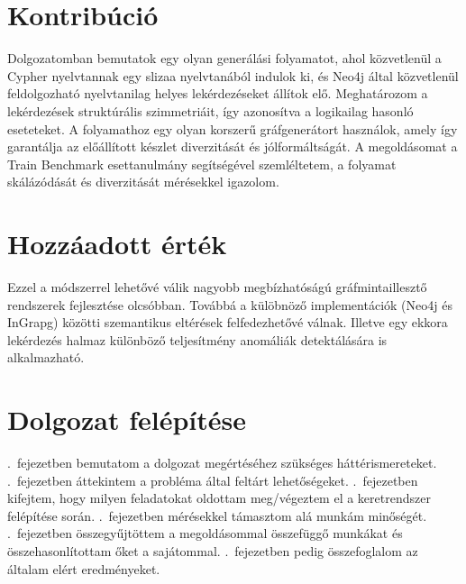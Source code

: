 \section{Kontribúció}
Dolgozatomban bemutatok egy olyan generálási folyamatot, ahol közvetlenül a Cypher nyelvtannak egy slizaa \cite{slizaa_2018} nyelvtanából indulok ki, és Neo4j által  közvetlenül feldolgozható nyelvtanilag helyes lekérdezéseket állítok elő. Meghatározom a lekérdezések struktúrális szimmetriáit, így azonosítva a logikailag hasonló eseteteket. A folyamathoz egy olyan korszerű gráfgenerátort használok, amely így garantálja az előállított készlet diverzitását és jólformáltságát. A megoldásomat a Train Benchmark \cite{szarnyas2018train} esettanulmány segítségével szemléltetem, a folyamat skálázódását és diverzitását mérésekkel igazolom.


\section{Hozzáadott érték}
Ezzel a módszerrel lehetővé válik nagyobb megbízhatóságú gráfmintaillesztő rendszerek fejlesztése olcsóbban. Továbbá a külöbnöző implementációk (Neo4j és InGrapg) közötti szemantikus eltérések felfedezhetővé válnak. Illetve egy ekkora lekérdezés halmaz különböző teljesítmény anomáliák detektálására is alkalmazható. 

\section{Dolgozat felépítése}
.~fejezetben bemutatom a dolgozat megértéséhez szükséges háttérismereteket. .~fejezetben áttekintem a probléma által feltárt lehetőségeket. .~fejezetben kifejtem, hogy milyen feladatokat oldottam meg/végeztem el a keretrendszer felépítése során. .~fejezetben mérésekkel támasztom alá munkám minőségét. .~fejezetben összegyűjtöttem a megoldásommal összefüggő munkákat és összehasonlítottam őket a sajátommal. .~fejezetben pedig összefoglalom az általam elért eredményeket.

